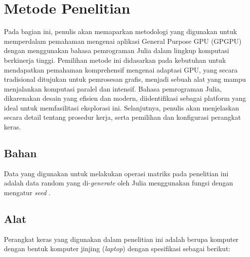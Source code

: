\chapter{Metode Penelitian}


Pada bagian ini, penulis akan memaparkan metodologi yang digunakan untuk
memperdalam pemahaman mengenai aplikasi General Purpose GPU (GPGPU) dengan
menggunakan bahasa pemrograman Julia dalam lingkup komputasi berkinerja tinggi.
Pemilihan metode ini didasarkan pada kebutuhan untuk mendapatkan pemahaman
komprehensif mengenai adaptasi GPU, yang secara tradisional ditujukan untuk
pemrosesan grafis, menjadi sebuah alat yang mampu menjalankan komputasi paralel
dan intensif. Bahasa pemrograman Julia, dikarenakan desain yang efisien dan
modern, diidentifikasi sebagai platform yang ideal untuk memfasilitasi
eksplorasi ini. Selanjutnya, penulis akan menjelaskan secara detail tentang
prosedur kerja, serta pemilihan dan konfigurasi perangkat keras.

\section{Bahan}

Data yang digunakan untuk melakukan operasi matriks pada penelitian ini adalah
data random yang di-\emph{generate} oleh Julia menggunakan fungsi 
dengan mengatur \emph{seed} .

\section{Alat}

Perangkat keras yang digunakan dalam penelitian ini adalah berupa komputer
dengan bentuk komputer jinjing (\emph{laptop}) dengan spesifikasi sebagai
berikut:

